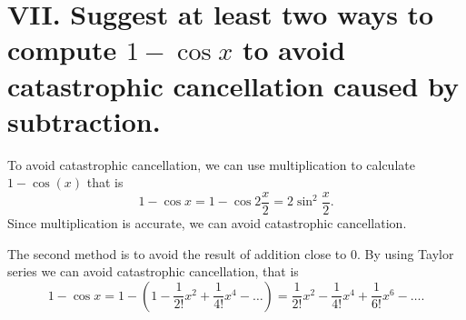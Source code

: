\documentclass[twoside,a4paper]{article}
\begin{document}
\section*{VII. \small{Suggest at least two ways to compute $1-\cos x$ to avoid catastrophic cancellation caused by subtraction.}}
To avoid catastrophic cancellation, we can use multiplication to calculate $1-\cos\left(x \right) $ that is 
\[
	1-\cos x=1-\cos 2\frac{x}{2}=2\sin ^{2}\frac{x}{2}
.\] 
Since multiplication is accurate, we can avoid catastrophic cancellation.

The second method is to avoid the result of addition close to 0.
By using Taylor series we can avoid catastrophic cancellation, that is 
\[
	1-\cos x=1-\left( 1-\frac{1}{2!}x^{2}+\frac{1}{4!}x^{4}-\ldots \right)
	=\frac{1}{2!}x^{2}-\frac{1}{4!}x^{4}+\frac{1}{6!}x^{6}-\ldots 
.\]
\end{document}
